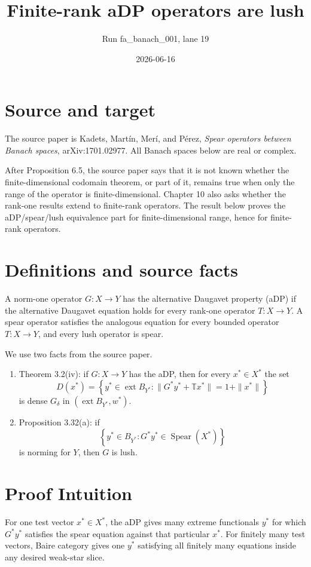 \documentclass[11pt]{article}
\title{Finite-rank aDP operators are lush}
\author{Run fa\_banach\_001, lane 19}
\date{2026-06-16}
\newcommand{\T}{\mathbb T}
\newcommand{\Spear}{\operatorname{Spear}}
\newcommand{\ext}{\operatorname{ext}}
\begin{document}
\maketitle

\section*{Source and target}

The source paper is Kadets, Mart\'in, Mer\'i, and P\'erez,
\emph{Spear operators between Banach spaces}, arXiv:1701.02977.
All Banach spaces below are real or complex.

After Proposition 6.5, the source paper says that it is not known whether
the finite-dimensional codomain theorem, or part of it, remains true when
only the range of the operator is finite-dimensional.  Chapter 10 also asks
whether the rank-one results extend to finite-rank operators.  The result
below proves the aDP/spear/lush equivalence part for finite-dimensional
range, hence for finite-rank operators.

\section*{Definitions and source facts}

A norm-one operator \(G:X\to Y\) has the alternative Daugavet property
(aDP) if the alternative Daugavet equation holds for every rank-one
operator \(T:X\to Y\).  A spear operator satisfies the analogous equation
for every bounded operator \(T:X\to Y\), and every lush operator is spear.

We use two facts from the source paper.

\begin{enumerate}
\item Theorem 3.2(iv): if \(G:X\to Y\) has the aDP, then for every
\(x^*\in X^*\) the set
\[
D(x^*)=\left\{y^*\in \ext B_{Y^*}:
\|G^*y^*+\T x^*\|=1+\|x^*\|\right\}
\]
is dense \(G_\delta\) in \((\ext B_{Y^*},w^*)\).
\item Proposition 3.32(a): if
\[
\left\{y^*\in B_{Y^*}:G^*y^*\in \Spear(X^*)\right\}
\]
is norming for \(Y\), then \(G\) is lush.
\end{enumerate}

\section*{Proof Intuition}

For one test vector \(x^*\in X^*\), the aDP gives many extreme functionals
\(y^*\) for which \(G^*y^*\) satisfies the spear equation against that
particular \(x^*\).  For finitely many test vectors, Baire category gives
one \(y^*\) satisfying all finitely many equations inside any desired
weak-star slice.
\end{document}
